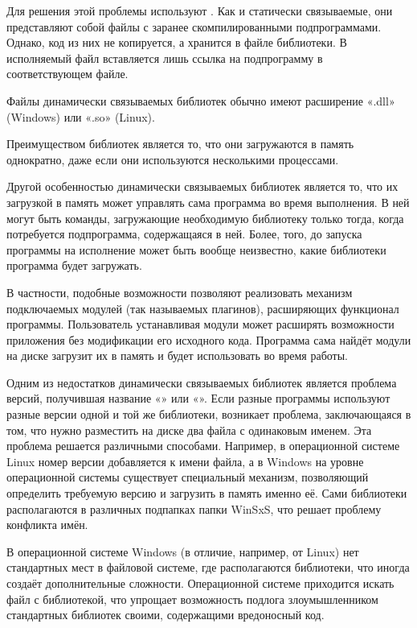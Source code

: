 Для решения этой проблемы используют .  Как и статически
связываемые, они представляют собой файлы с заранее скомпилированными
подпрограммами. Однако, код из них не копируется, а хранится в файле
библиотеки. В исполняемый файл вставляется лишь ссылка на подпрограмму
в соответствующем файле.

Файлы динамически связываемых библиотек обычно имеют расширение «.dll»
(Windows) или «.so» (Linux).

Преимуществом библиотек является то, что они загружаются в память
однократно, даже если они используются несколькими процессами.

Другой особенностью динамически связываемых библиотек является то, что
их загрузкой в память может управлять сама программа во время
выполнения. В ней могут быть команды, загружающие необходимую
библиотеку только тогда, когда потребуется подпрограмма, содержащаяся
в ней.  Более, того, до запуска программы на исполнение может быть
вообще неизвестно, какие библиотеки программа будет загружать.

В частности, подобные возможности позволяют реализовать механизм
подключаемых модулей (так называемых плагинов), расширяющих
функционал программы.  Пользователь устанавливая модули может
расширять возможности приложения без модификации его исходного
кода. Программа сама найдёт модули на диске загрузит их в память и
будет использовать во время работы.

Одним из недостатков динамически связываемых библиотек является
проблема версий, получившая название «» или
«». Если разные программы
используют разные версии одной и той же библиотеки, возникает
проблема, заключающаяся в том, что нужно разместить на диске два файла
с одинаковым именем. Эта проблема решается различными
способами. Например, в операционной системе Linux номер версии
добавляется к имени файла, а в Windows на уровне операционной системы
существует специальный механизм, позволяющий определить требуемую
версию и загрузить в память именно её. Сами библиотеки располагаются в
различных подпапках папки WinSxS, что решает проблему конфликта имён.

В операционной системе Windows (в отличие, например, от Linux) нет
стандартных мест в файловой системе, где располагаются библиотеки, что
иногда создаёт дополнительные сложности. Операционной системе
приходится искать файл с библиотекой, что упрощает возможность подлога
злоумышленником стандартных библиотек своими, содержащими вредоносный
код.

